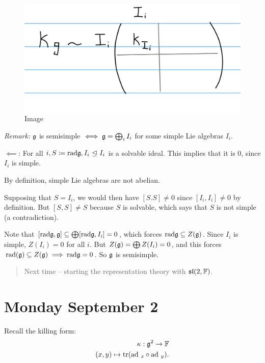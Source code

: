 \begin{figure}
\centering
\includegraphics{figures/2019-09-06-09:48.png}
\caption{Image}
\end{figure}

\emph{Remark:} \({\mathfrak{g}}\) is semisimple \(\iff {\mathfrak{g}} = \bigoplus_i I_i\)
for some simple Lie algebras \(I_i\).

\(\impliedby\): For all
\(i, S \coloneqq \mathrm{rad} {\mathfrak{g}}, I_i {~\trianglelefteq~} I_i\) is a solvable
ideal. This implies that it is 0, since \(I_i\) is simple.

By definition, simple Lie algebras are not abelian.

Supposing that \(S = I_i\), we would then have \([S. S] \neq 0\) since
\([I_i, I_i] \neq 0\) by definition. But \([S, S] \neq S\) because \(S\)
is solvable, which says that \(S\) is not simple (a contradiction).

Note that
\([\mathrm{rad}{\mathfrak{g}}, {\mathfrak{g}}] \subseteq \bigoplus [\mathrm{rad} {\mathfrak{g}}, I_i] = 0\),
which forces \(\mathrm{rad}{\mathfrak{g}} \subseteq Z({\mathfrak{g}})\). Since \(I_i\) is
simple, \(Z(I_i) = 0\) for all \(i\). But
\(Z({\mathfrak{g}}) = \bigoplus Z(I_i) = 0\), and this forces
\(\mathrm{rad}({\mathfrak{g}}) \subseteq Z({\mathfrak{g}}) \implies \mathrm{rad}{\mathfrak{g}} = 0\).
So \({\mathfrak{g}}\) is semisimple.

\begin{quote}
Next time -- starting the representation theory with \({\mathfrak{sl}}(2, {\mathbb{F}})\).
\end{quote}

\hypertarget{monday-september-2}{%
\section{Monday September 2}\label{monday-september-2}}

Recall the killing form: \begin{align*}
\kappa: {\mathfrak{g}}^2 \to {\mathbb{F}} \\
(x,y) \mapsto \mathrm{tr}(\mathrm{ad}~_x \circ \mathrm{ad}~_y)
.\end{align*}


